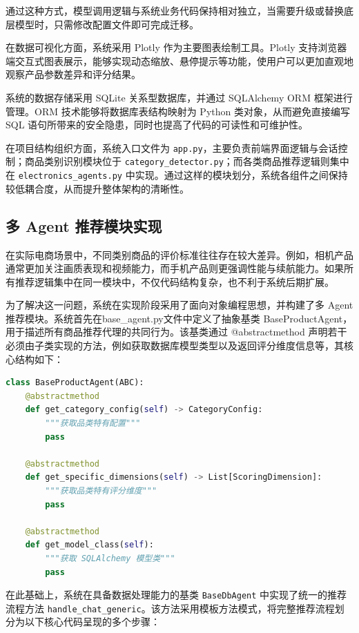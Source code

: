 \documentclass{nkuthesis}
\begin{document}
通过这种方式，模型调用逻辑与系统业务代码保持相对独立，当需要升级或替换底层模型时，只需修改配置文件即可完成迁移。

在数据可视化方面，系统采用 Plotly 作为主要图表绘制工具。Plotly 支持浏览器端交互式图表展示，能够实现动态缩放、悬停提示等功能，使用户可以更加直观地观察产品参数差异和评分结果。

系统的数据存储采用 SQLite 关系型数据库，并通过 SQLAlchemy ORM 框架进行管理。ORM 技术能够将数据库表结构映射为 Python 类对象，从而避免直接编写 SQL 语句所带来的安全隐患，同时也提高了代码的可读性和可维护性。

在项目结构组织方面，系统入口文件为 \texttt{app.py}，主要负责前端界面逻辑与会话控制；商品类别识别模块位于 \texttt{category\_detector.py}；而各类商品推荐逻辑则集中在 \texttt{electronics\_agents.py} 中实现。通过这样的模块划分，系统各组件之间保持较低耦合度，从而提升整体架构的清晰性。

\subsection{多 Agent 推荐模块实现}

在实际电商场景中，不同类别商品的评价标准往往存在较大差异。例如，相机产品通常更加关注画质表现和视频能力，而手机产品则更强调性能与续航能力。如果所有推荐逻辑集中在同一模块中，不仅代码结构复杂，也不利于系统后期扩展。

为了解决这一问题，系统在实现阶段采用了面向对象编程思想，并构建了多 Agent 推荐模块。系统首先在base\_agent.py文件中定义了抽象基类 BaseProductAgent，用于描述所有商品推荐代理的共同行为。该基类通过 @abstractmethod 声明若干必须由子类实现的方法，例如获取数据库模型类型以及返回评分维度信息等，其核心结构如下：

\begin{lstlisting}[language=Python, caption={推荐代理基类定义（片段，摘自 base\_agent.py）}]
class BaseProductAgent(ABC):
    @abstractmethod
    def get_category_config(self) -> CategoryConfig:
        """获取品类特有配置"""
        pass
    
    @abstractmethod
    def get_specific_dimensions(self) -> List[ScoringDimension]:
        """获取品类特有评分维度"""
        pass
        
    @abstractmethod
    def get_model_class(self):
        """获取 SQLAlchemy 模型类"""
        pass
\end{lstlisting}

在此基础上，系统在具备数据处理能力的基类 \texttt{BaseDbAgent} 中实现了统一的推荐流程方法 \texttt{handle\_chat\_generic}。该方法采用模板方法模式，将完整推荐流程划分为以下核心代码呈现的多个步骤：
\end{document}
